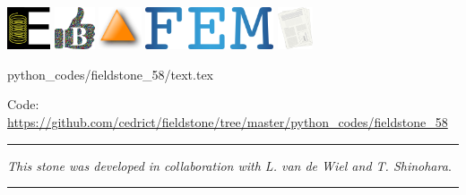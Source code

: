 \includegraphics[height=1.25cm]{images/pictograms/elasticity}
\includegraphics[height=1.25cm]{images/pictograms/benchmark}
\includegraphics[height=1.25cm]{images/pictograms/triangle}
\includegraphics[height=1.25cm]{images/pictograms/FEM}
\includegraphics[height=1.25cm]{images/pictograms/publication}



\begin{flushright} {\tiny {\color{gray} python\_codes/fieldstone\_58/text.tex}} \end{flushright}



\begin{center}
\inpython
\infortran
Code: \url{https://github.com/cedrict/fieldstone/tree/master/python_codes/fieldstone_58}
\end{center}


\par\noindent\rule{\textwidth}{0.4pt}

{\sl This stone was developed in collaboration with L. van de Wiel and T. Shinohara}. 

\par\noindent\rule{\textwidth}{0.4pt}




